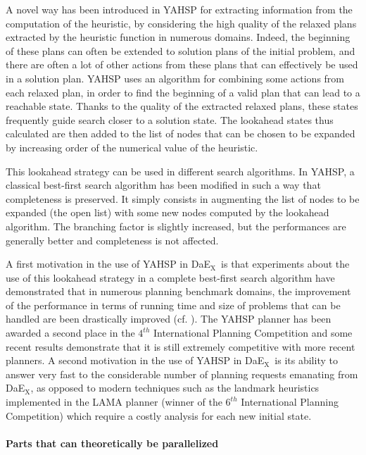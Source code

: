 \documentclass{sig-alternate}
\newcommand{\DAEX}{{\sc DaE$_{\text{X}}$}}
\newcommand{\DAEYAHSP}{{\sc DaE$_{\text{YAHSP}}$}}
\begin{document}
A novel  way has been  introduced in YAHSP  for extracting information  from the
computation of  the heuristic,  by considering the  high quality of  the relaxed
plans  extracted by  the heuristic  function in  numerous domains.   Indeed, the
beginning of these plans can often  be extended to solution plans of the initial
problem, and there  are often a lot  of other actions from these  plans that can
effectively be  used in a solution  plan. YAHSP uses an  algorithm for combining
some actions from each  relaxed plan, in order to find the  beginning of a valid
plan that can lead to a reachable  state. Thanks to the quality of the extracted
relaxed  plans,  these states  frequently  guide  search  closer to  a  solution
state. The lookahead states thus calculated  are then added to the list of nodes
that can be chosen to be expanded  by increasing order of the numerical value of
the  heuristic.

This lookahead  strategy can be used  in different search  algorithms. In YAHSP,
a classical  best-first search algorithm  has been modified  in such a  way that
completeness is preserved.   It simply consists in augmenting  the list of nodes
to be  expanded (the open  list) with some  new nodes computed by  the lookahead
algorithm.  The branching factor is slightly increased, but the performances are
generally better and completeness is not affected.

A first motivation in  the use of YAHSP in \DAEX\ is  that experiments about the
use of  this lookahead strategy in  a complete best-first  search algorithm have
demonstrated that in numerous planning benchmark domains, the improvement of the
performance in  terms of running time and  size of problems that  can be handled
are been  drastically improved (cf. \cite{yahsp:icaps2004}).   The YAHSP planner
has been  awarded a second place  in the $4^{th}$  International Planning Competition
\cite{ipc4:jair05} and some  recent results \cite{rintanen:acai2010} demonstrate
that  it is still  extremely competitive  with more  recent planners.   A second
motivation in the use  of YAHSP in \DAEX\ is its ability  to answer very fast to
the considerable number of planning requests emanating from \DAEX, as opposed to
modern  techniques such  as  the  landmark heuristics  implemented  in the  LAMA
planner   \cite{lama:jair2010}  (winner  of   the  $6^{th}$   International  Planning
Competition) which require a costly analysis for each new initial state.

\paragraph{Parts that can theoretically be parallelized} %
\end{document}
